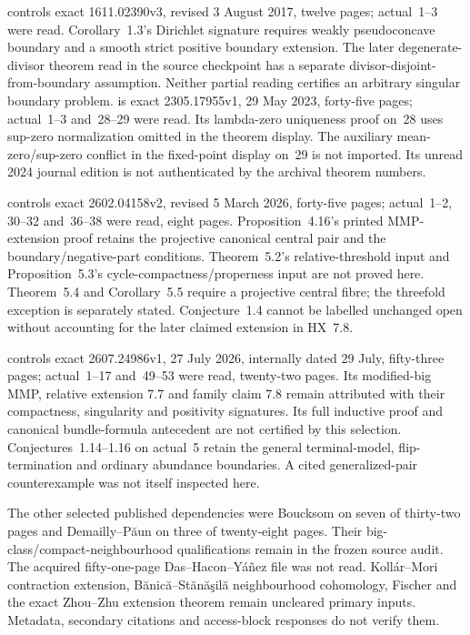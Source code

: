\cite{ChuTosattiWeinkove17GeodesicsV3} controls exact
1611.02390v3, revised 3 August 2017, twelve pages; actual~1--3
were read. Corollary~1.3's Dirichlet signature requires weakly
pseudoconcave boundary and a smooth strict positive boundary
extension. The later degenerate-divisor theorem read in the source
checkpoint has a separate divisor-disjoint-from-boundary assumption.
Neither partial reading certifies an arbitrary singular boundary
problem. \cite{LiWangZhou23HermitianV1} is exact
2305.17955v1, 29 May 2023, forty-five pages; actual~1--3
and~28--29 were read. Its lambda-zero uniqueness proof on~28
uses sup-zero normalization omitted in the theorem display.
The auxiliary mean-zero/sup-zero conflict in the fixed-point
display on~29 is not imported. Its unread 2024 journal edition
is not authenticated by the archival theorem numbers.

\cite{HaconLiRao26AdjointV2} controls exact
2602.04158v2, revised 5 March 2026, forty-five pages;
actual~1--2, 30--32 and~36--38 were read, eight pages.
Proposition~4.16's printed MMP-extension proof retains the
projective canonical central pair and the boundary/negative-part
conditions. Theorem~5.2's relative-threshold input and
Proposition~5.3's cycle-compactness/properness input are not
proved here. Theorem~5.4 and Corollary~5.5 require a projective
central fibre; the threefold exception is separately stated.
Conjecture~1.4 cannot be labelled unchanged open without
accounting for the later claimed extension in HX~7.8.

\cite{HaconXie26MMPV1} controls exact 2607.24986v1,
27 July 2026, internally dated 29 July, fifty-three pages;
actual~1--17 and~49--53 were read, twenty-two pages.
Its modified-big MMP, relative extension 7.7 and family claim
7.8 remain attributed with their compactness, singularity and
positivity signatures. Its full inductive proof and canonical
bundle-formula antecedent are not certified by this selection.
Conjectures~1.14--1.16 on actual~5 retain the general terminal-model,
flip-termination and ordinary abundance boundaries. A cited
generalized-pair counterexample was not itself inspected here.

The other selected published dependencies were Boucksom on
seven of thirty-two pages and Demailly--P\u{a}un on three of
twenty-eight pages. Their big-class/compact-neighbourhood
qualifications remain in the frozen source audit. The acquired
fifty-one-page Das--Hacon--Y\'a\~nez file was not read.
Koll\'ar--Mori contraction extension, B\u{a}nic\u{a}--St\u{a}n\u{a}\c{s}il\u{a}
neighbourhood cohomology, Fischer and the exact Zhou--Zhu
extension theorem remain uncleared primary inputs. Metadata,
secondary citations and access-block responses do not verify them.

